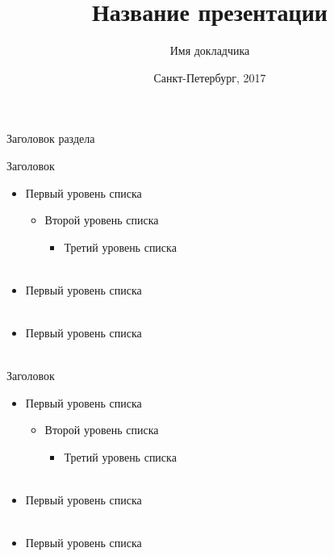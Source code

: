 \documentclass[14pt]{beamer}
\title[Название Вашего доклада]{Название презентации}
\author[]{Имя докладчика}
\institute[]{Университет ИТМО}
\date[]{Санкт-Петербург, 2017}
\begin{document}
\itmologoslide

\begin{darkbars}
    \begin{frame}
        \titlepage
    \end{frame}
\end{darkbars}

\begin{frame}
    \itmoanothertitle
\end{frame}

\begin{frame}[englogoheader]{Заголовок раздела}
\end{frame}

\begin{frame}{Заголовок}
    \begin{itemize}
        \item Первый уровень списка
            \begin{itemize}
                \item Второй уровень списка
                    \begin{itemize}
                        \item Третий уровень списка\\
                            ~
                    \end{itemize}
            \end{itemize}
        \item Первый уровень списка\\
            ~
        \item Первый уровень списка\\
            ~
    \end{itemize}
\end{frame}

\begin{frame}{Заголовок}
    \begin{itemize}
        \item Первый уровень списка
            \begin{itemize}
                \item Второй уровень списка
                    \begin{itemize}
                        \item Третий уровень списка\\
                            ~
                    \end{itemize}
            \end{itemize}
        \item Первый уровень списка\\
            ~
        \item Первый уровень списка\\
            ~
    \end{itemize}
\end{frame}

\begin{frame}[nologo]
\end{frame}

\itmothankyou
\end{document}
